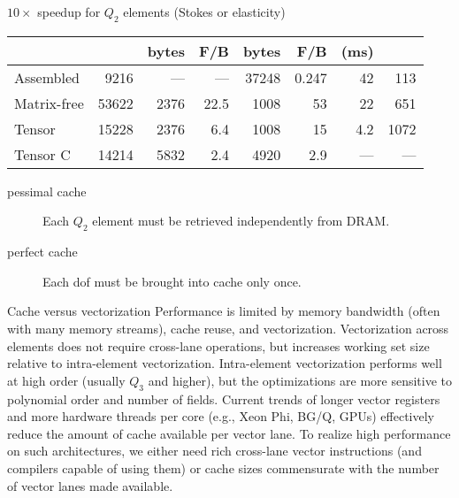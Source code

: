 \documentclass[final,t]{beamer}
\begin{document}
\begin{frame}{}
\begin{columns}
\begin{column}{0.48\textwidth}
\begin{block}{$10\times$ speedup for $Q_2$ elements (Stokes or elasticity)}
\begin{table}
\begin{tabular}{lrrrrrrr}
            & & bytes & F/B & bytes & F/B & (ms) & \\
            \midrule
            Assembled & 9216 & --- & --- &  37248 & 0.247 & 42 & 113 \\
            Matrix-free & 53622 & 2376 & 22.5 & 1008 & 53 & 22 & 651 \\
            Tensor & 15228 & 2376 & 6.4 & 1008 & 15 & 4.2 & 1072 \\
            Tensor C & 14214 & 5832 & 2.4 & 4920 & 2.9 & --- & --- \\
            \bottomrule
          \end{tabular}
        \end{table}
        \begin{description}
        \item[pessimal cache] Each $Q_2$ element must be retrieved independently from DRAM.
        \item[perfect cache] Each dof must be brought into cache only once.
        \end{description}
      \end{block}
      \vspace{-2.2em}
      \begin{block}{Cache versus vectorization}
        Performance is limited by memory bandwidth (often with many memory streams), cache reuse, and vectorization.
        Vectorization across elements does not require cross-lane operations, but increases working set size relative to intra-element vectorization.
        Intra-element vectorization performs well at high order (usually $Q_3$ and higher), but the optimizations are more sensitive to polynomial order and number of fields.
        Current trends of longer vector registers and more hardware threads per core (e.g., Xeon Phi, BG/Q, GPUs) effectively reduce the amount of cache available per vector lane.
        To realize high performance on such architectures, we either need rich cross-lane vector instructions (and compilers capable of using them) or cache sizes commensurate with the number of vector lanes made available.


\end{block}
\end{column}
\end{columns}
\end{frame}
\end{document}
